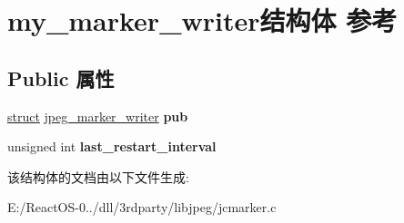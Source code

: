 \hypertarget{structmy__marker__writer}{}\section{my\+\_\+marker\+\_\+writer结构体 参考}
\label{structmy__marker__writer}
\subsection*{Public 属性}
\begin{DoxyCompactItemize}
\item 
\mbox{\label{structmy__marker__writer_a4b02f71e32586520f4498e51a79b1fca}} 
\hyperlink{interfacestruct}{struct} \hyperlink{structjpeg__marker__writer}{jpeg\+\_\+marker\+\_\+writer} {\bfseries pub}
\item 
\mbox{\label{structmy__marker__writer_a772bc536da8c387a460a529c3d8145e4}} 
unsigned int {\bfseries last\+\_\+restart\+\_\+interval}
\end{DoxyCompactItemize}


该结构体的文档由以下文件生成\+:\begin{DoxyCompactItemize}
\item 
E\+:/\+React\+O\+S-\/0../dll/3rdparty/libjpeg/jcmarker.\+c\end{DoxyCompactItemize}

